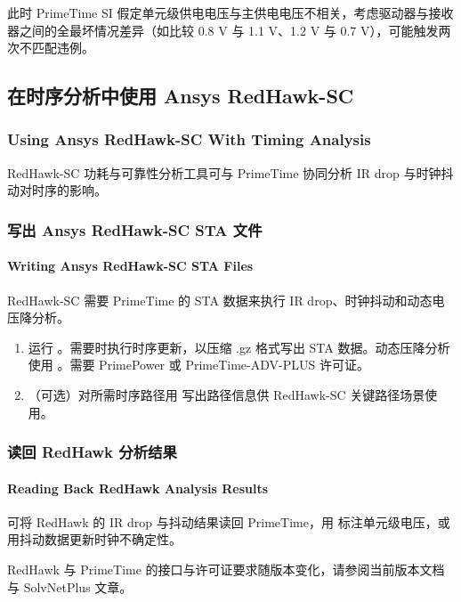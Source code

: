 此时 PrimeTime SI 假定单元级供电电压与主供电电压不相关，考虑驱动器与接收器之间的全最坏情况差异（如比较 0.8 V 与 1.1 V、1.2 V 与 0.7 V），可能触发两次不匹配违例。

\subsection{在时序分析中使用 Ansys RedHawk-SC}
\subsubsection*{Using Ansys RedHawk-SC With Timing Analysis}

RedHawk-SC 功耗与可靠性分析工具可与 PrimeTime 协同分析 IR drop 与时钟抖动对时序的影响。

\subsubsection{写出 Ansys RedHawk-SC STA 文件}
\paragraph*{Writing Ansys RedHawk-SC STA Files}

RedHawk-SC 需要 PrimeTime 的 STA 数据来执行 IR drop、时钟抖动和动态电压降分析。

\begin{enumerate}
  \item 运行 。需要时执行时序更新，以压缩 .gz 格式写出 STA 数据。动态压降分析使用 。需要 PrimePower 或 PrimeTime-ADV-PLUS 许可证。
  \item （可选）对所需时序路径用  写出路径信息供 RedHawk-SC 关键路径场景使用。
\end{enumerate}

\subsubsection{读回 RedHawk 分析结果}
\paragraph*{Reading Back RedHawk Analysis Results}

可将 RedHawk 的 IR drop 与抖动结果读回 PrimeTime，用  标注单元级电压，或用抖动数据更新时钟不确定性。

\begin{noteBox}
RedHawk 与 PrimeTime 的接口与许可证要求随版本变化，请参阅当前版本文档与 SolvNetPlus 文章。
\end{noteBox}
